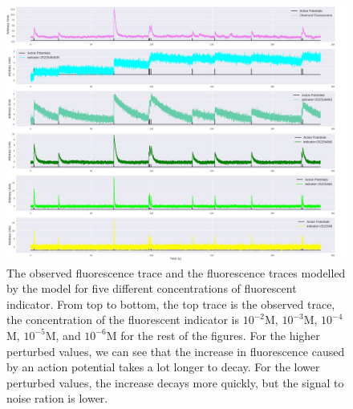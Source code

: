 \documentclass[a4paper,12pt]{article}
\theoremstyle{definition}
\begin{document}
\begin{figure}[ht]
  \centering
  \includegraphics[width=\textwidth]{figures/indicator_peturbed_fluorescence_18.png}
  \caption{The observed fluorescence trace and the fluorescence traces modelled by the model for five different concentrations of fluorescent indicator. From top to bottom, the top trace is the observed trace, the concentration of the fluorescent indicator is $10^{-2}$M, $10^{-3}$M, $10^{-4}$M, $10^{-5}$M, and $10^{-6}$M for the rest of the figures. For the higher perturbed values, we can see that the increase in fluorescence caused by an action potential takes a lot longer to decay. For the lower perturbed values, the increase decays more quickly, but the signal to noise ration is lower.}
  \label{fig:indicator_perturbed_fluorescence}
\end{figure}
\end{document}
